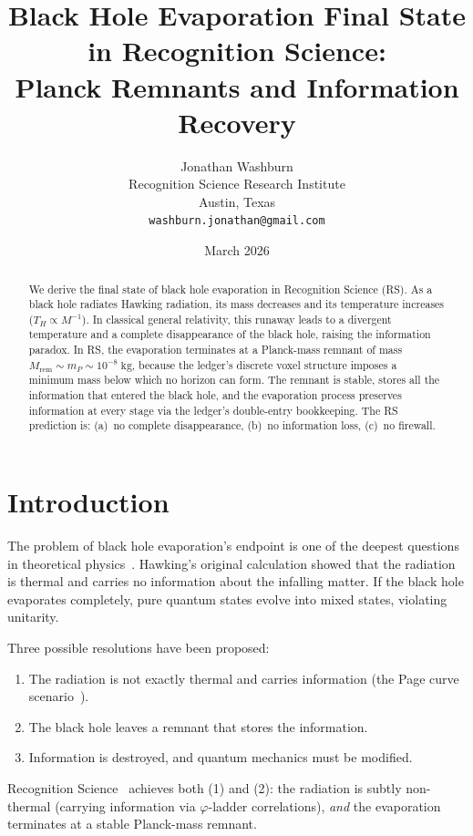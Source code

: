 \documentclass[12pt,a4paper]{article}
\title{Black Hole Evaporation Final State in Recognition Science:\\
Planck Remnants and Information Recovery}
\author{Jonathan Washburn\\
Recognition Science Research Institute\\
Austin, Texas\\
\texttt{washburn.jonathan@gmail.com}}
\date{March 2026}
\theoremstyle{definition}
\theoremstyle{remark}
\begin{document}
\maketitle

\begin{abstract}
We derive the final state of black hole evaporation in Recognition
Science (RS).  As a black hole radiates Hawking radiation, its mass
decreases and its temperature increases ($T_H \propto M^{-1}$).
In classical general relativity, this runaway leads to a divergent
temperature and a complete disappearance of the black hole, raising
the information paradox.  In RS, the evaporation terminates at a
Planck-mass remnant of mass
$M_{\mathrm{rem}} \sim m_P \sim 10^{-8}\;\mathrm{kg}$, because
the ledger's discrete voxel structure imposes a minimum mass below
which no horizon can form.  The remnant is stable, stores all the
information that entered the black hole, and the evaporation
process preserves information at every stage via the ledger's
double-entry bookkeeping.  The RS prediction is: (a)~no complete
disappearance, (b)~no information loss, (c)~no firewall.
\end{abstract}

\section{Introduction}

The problem of black hole evaporation's endpoint is one of the
deepest questions in theoretical physics~\cite{Hawking1976}.
Hawking's original calculation showed that the radiation is thermal
and carries no information about the infalling matter.  If the
black hole evaporates completely, pure quantum states evolve into
mixed states, violating unitarity.

Three possible resolutions have been proposed:
\begin{enumerate}
  \item The radiation is not exactly thermal and carries information
  (the Page curve scenario~\cite{Page1993}).
  \item The black hole leaves a remnant that stores the information.
  \item Information is destroyed, and quantum mechanics must be
  modified.
\end{enumerate}

Recognition Science~\cite{RS_Axioms} achieves both (1) and (2):
the radiation is subtly non-thermal (carrying information via
$\varphi$-ladder correlations), \emph{and} the evaporation
terminates at a stable Planck-mass remnant.
\end{document}
